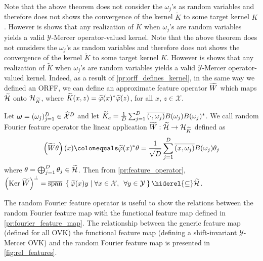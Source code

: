 \documentclass[twoside,11pt]{article}
\begin{document}
Note that the above theorem does not consider the $\omega_j$'s as random
variables and therefore does not shows the convergence of the kernel
$\widetilde{K}$ to some target kernel $K$. However is shows that any
realization of $\widetilde{K}$ when $\omega_j$'s  are random variables yields
a valid $\mathcal{Y}$-Mercer operator-valued kernel.
Note that the above theorem does not considers the $\omega_j$'s as random
variables and therefore does not shows the convergence of the kernel
$\widetilde{K}$ to some target kernel $K$. However is shows that any
realization of $\widetilde{K}$ when $\omega_j$'s  are random variables yields
a valid $\mathcal{Y}$-Mercer operator-valued kernel.  Indeed, as a result of
\cref{pr:orff_defines_kernel}, in the same way we defined an \acs{ORFF}, we can
define an approximate feature operator $\widetilde{W}$ which maps
$\widetilde{\mathcal{H}}$ onto $\mathcal{H}_{\widetilde{K}}$, where
$\tildeK{\omega}(x,z)= \tildePhi{\omega}(x)^\adjoint\tildePhi{\omega}(z)$, for
all $x$, $z\in\mathcal{X}$.
\begin{definition}
    Let $\boldsymbol{\mathbf{\omega}}=(\omega_j)_{j=1}^D\in\widehat{\mathcal{X}}^D$ and let
    $\widetilde{K}_e=\frac{1}{D}\sum_{j=1}^D
    \overline{(\cdot,\omega_j)}B(\omega_j)B(\omega_j)^*$.  We call
    random Fourier feature operator the linear application
    $\widetilde{W}:\widetilde{\mathcal{H}}\to \mathcal{H}_{\widetilde{K}}$ defined
    as
    \begin{dmath*}
        \left(\tildeW{\omega} \theta\right)(x)
        \colonequals \tildePhi{\omega}(x)^\adjoint \theta
        =\frac{1}{\sqrt{D}}\sum_{j=1}^D
        \conj{\pairing{x,\omega_j}}B(\omega_j)\theta_j
    \end{dmath*}
    where $\theta=\operatorname*{\bigoplus}_{j=1}^D\theta_j \in\widetilde{\mathcal{H}}$.  Then from
    \cref{pr:feature_operator}, $\left(\Ker \tildeW{\omega}\right)^\perp =
    \lspan\Set{\tildePhi{\omega}(x)y | \forall x\in\mathcal{X},\enskip \forall
    y\in\mathcal{Y}} \hiderel{\subseteq} \tildeH{\omega}$.
\end{definition}
The random Fourier feature operator is useful to show the relations between the
random Fourier feature map with the functional feature map defined in
\cref{pr:fourier_feature_map}. The relationship between the generic feature map
(defined for all \acl{OVK}) the functional feature map (defining a
shift-invariant $\mathcal{Y}$-Mercer \acl{OVK}) and the random Fourier feature
map is presented in \cref{fig:rel_features}.
\end{document}
